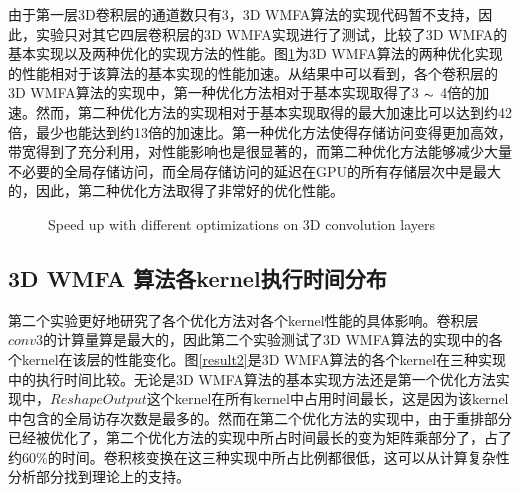 由于第一层3D卷积层的通道数只有3，3D WMFA算法的实现代码暂不支持，因此，实验只对其它四层卷积层的3D WMFA实现进行了测试，比较了3D WMFA的基本实现以及两种优化的实现方法的性能。图\ref{result1}为3D WMFA算法的两种优化实现的性能相对于该算法的基本实现的性能加速。从结果中可以看到，各个卷积层的3D WMFA算法的实现中，第一种优化方法相对于基本实现取得了3 $\thicksim$ 4倍的加速。然而，第二种优化方法的实现相对于基本实现取得的最大加速比可以达到约42倍，最少也能达到约13倍的加速比。第一种优化方法使得存储访问变得更加高效，带宽得到了充分利用，对性能影响也是很显著的，而第二种优化方法能够减少大量不必要的全局存储访问，而全局存储访问的延迟在GPU的所有存储层次中是最大的，因此，第二种优化方法取得了非常好的优化性能。

\begin{figure}[tbh]%
\centering
{}
\caption{Speed up with different optimizations on 3D convolution layers}
\label{result1}
\end{figure}

\subsection{3D WMFA 算法各kernel执行时间分布}
第二个实验更好地研究了各个优化方法对各个kernel性能的具体影响。卷积层$conv3$的计算量算是最大的，因此第二个实验测试了3D WMFA算法的实现中的各个kernel在该层的性能变化。图\ref{result2}是3D WMFA算法的各个kernel在三种实现中的执行时间比较。无论是3D WMFA算法的基本实现方法还是第一个优化方法实现中，$ReshapeOutput$这个kernel在所有kernel中占用时间最长，这是因为该kernel中包含的全局访存次数是最多的。然而在第二个优化方法的实现中，由于重排部分已经被优化了，第二个优化方法的实现中所占时间最长的变为矩阵乘部分了，占了约$60\%$的时间。卷积核变换在这三种实现中所占比例都很低，这可以从计算复杂性分析部分找到理论上的支持。

